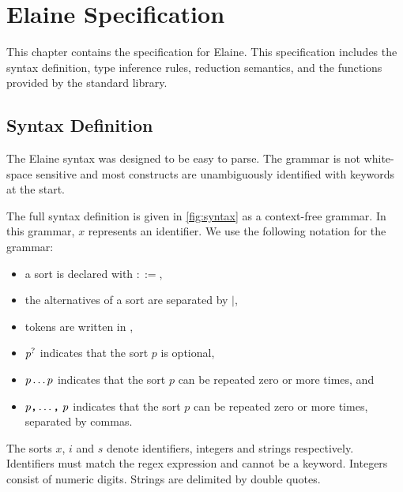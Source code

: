 \chapter{Elaine Specification}\label{chap:spec}

This chapter contains the specification for Elaine. This specification includes the syntax definition, type inference rules, reduction semantics, and the functions provided by the standard library.

\section{Syntax Definition}\label{sec:syntax}

The Elaine syntax was designed to be easy to parse. The grammar is not white-space sensitive and most constructs are unambiguously identified with keywords at the start.

The full syntax definition is given in \cref{fig:syntax} as a context-free grammar. In this grammar, $x$ represents an identifier. We use the following notation for the grammar:
\begin{itemize}
    \item a sort is declared with $::=$,
    \item the alternatives of a sort are separated by $|$,
    \item tokens are written in ,
    \item $p^?$ indicates that the sort $p$ is optional,
    \item $p \dots p$ indicates that the sort $p$ can be repeated zero or more times, and
    \item $p\text{\texttt{,}} \dots \text{\texttt{,}}\ p$ indicates that the sort $p$ can be repeated zero or more times, separated by commas.
\end{itemize}

The sorts $x$, $i$ and $s$ denote identifiers, integers and strings respectively. Identifiers must match the regex expression  and cannot be a keyword. Integers consist of numeric digits. Strings are delimited by double quotes.


